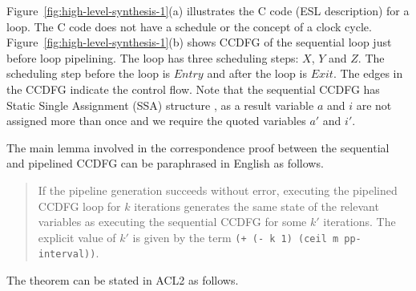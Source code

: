 Figure~\ref{fig:high-level-synthesis-1}(a) illustrates the C
code (ESL description) for a loop.  The C code does not have
a schedule or the concept of a clock cycle.
Figure~\ref{fig:high-level-synthesis-1}(b) shows CCDFG of the
sequential loop just before loop pipelining. The loop has
three scheduling steps: $X$, $Y$ and $Z$.  The scheduling
step before the loop is $Entry$ and after the loop is
$Exit$. The edges  in the CCDFG indicate the control flow.
Note that the sequential CCDFG has Static Single Assignment (SSA) structure
, as a result variable $a$ and $i$ are not assigned 
more than once and we require the quoted variables $a'$ and $i'$.




The main lemma involved in the correspondence proof between
the sequential and pipelined CCDFG can be paraphrased in English as follows. 

\begin{quote}
 If the pipeline generation succeeds without error,
 executing the pipelined CCDFG loop for $k$ iterations
 generates the same state of the relevant variables as
 executing the sequential CCDFG for some $k'$ iterations.
 The explicit value of $k'$ is given by the term {\tt (+ (-
   k 1) (ceil m pp-interval))}.
 \end{quote}

The theorem can be stated in ACL2 as follows.

